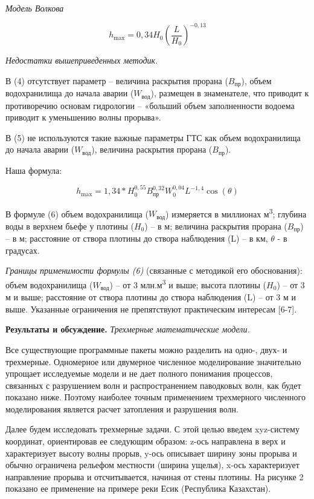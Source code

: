 \emph{Модель Волкова}

\begin{equation}
h_{\max} = 0,34H_{0}\left( \frac{L}{H_{0}} \right)^{- 0,13}
\end{equation}

\emph{Недостатки вышеприведенных методик.}

\begin{multicols}{2}
В (4) отсутствует параметр -- величина раскрытия прорана (\(B_{\text{пр}}\)),
объем водохранилища до начала аварии (\(W_{\text{вод}}\)), размещен в
знаменателе, что приводит к противоречию основам гидрологии -- «больший
объем заполненности водоема приводит к уменьшению волны прорыва».

В (5) не используются такие важные параметры ГТС как объем водохранилища
до начала аварии (\(W_{\text{вод}}\)), величина раскрытия прорана (\(B_{\text{пр}}\)).
\end{multicols}

Наша формула:

\begin{equation}
h_{\max} = 1,34*H_{0}^{0,55}B_{\text{пр}}^{0,32}W_{0}^{0,04}L^{- 1,4}\cos(\theta )
\end{equation}

\begin{multicols}{2}
В формуле (6) объем водохранилища (\(W_{\text{вод}}\)) измеряется в миллионах
м\textsuperscript{3}; глубина воды в верхнем бьефе у плотины (\(H_{0}\))
-- в м; величина раскрытия прорана (\(B_{\text{пр}}\)) -- в м; расстояние от
створа плотины до створа наблюдения (L) -- в км, \(\theta\) - в
градусах.

\emph{Границы применимости формулы (6)} (связанные с методикой его
обоснования): объем водохранилища (\(W_{\text{вод}}\)) -- от 3
млн.м\textsuperscript{3} и выше; высота плотины (\(H_{0}\)) -- от 3 м и
выше; расстояние от створа плотины до створа наблюдения (L) -- от 3 м и
выше. Указанные ограничения не препятствуют практическим интересам
{[}6-7{]}.

{\bfseries Результаты и обсуждение.} \emph{Трехмерные математические
модели.}

Все существующие программные пакеты можно разделить на одно-, двух- и
трехмерные. Одномерное или двумерное численное моделирование значительно
упрощает исследуемые модели и не дает полного понимания процессов,
связанных с разрушением волн и распространением паводковых волн, как
будет показано ниже. Поэтому наиболее точным применением трехмерного
численного моделирования является расчет затопления и разрушения волн.

Далее будем исследовать трехмерные задачи. С этой целью введем
xyz-систему координат, ориентировав ее следующим образом: z-ось
направлена в верх и характеризует высоту волны прорыв, y-ось описывает
ширину зоны прорыва и обычно ограничена рельефом местности (ширина
ущелья), x-ось характеризует направление прорыва и отсчитывается,
начиная от стены плотины. На рисунке 2 показано ее применение на примере
реки Есик (Республика Казахстан).
\end{multicols}

